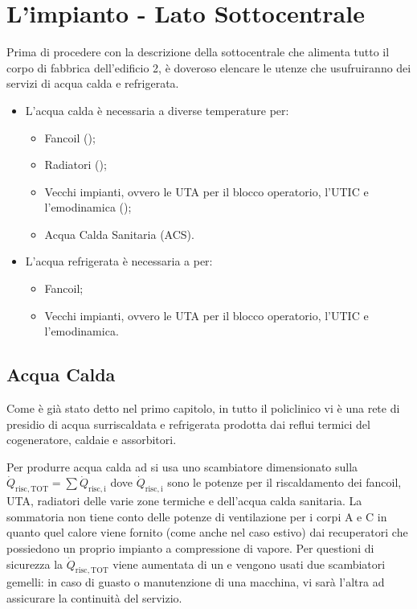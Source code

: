 \section{L'impianto - Lato Sottocentrale}
Prima di procedere con la descrizione della sottocentrale che alimenta tutto il corpo di fabbrica dell'edificio 2, è doveroso elencare le utenze che usufruiranno dei servizi di acqua calda e refrigerata.
\begin{itemize}
	\item L'acqua calda è necessaria a diverse temperature per:
	\begin{itemize}
		\item Fancoil ();
		\item Radiatori ();
		\item Vecchi impianti, ovvero le UTA per il blocco operatorio, l'UTIC e l'emodinamica ();
		\item Acqua Calda Sanitaria (ACS).
	\end{itemize}
	\item L'acqua refrigerata è necessaria a  per:
	\begin{itemize}
		\item Fancoil;
		\item Vecchi impianti, ovvero le UTA per il blocco operatorio, l'UTIC e l'emodinamica.
	\end{itemize}
\end{itemize}
\subsection{Acqua Calda}
Come è già stato detto nel primo capitolo, in tutto il policlinico vi è una rete di presidio di acqua surriscaldata e refrigerata prodotta dai reflui termici del cogeneratore, caldaie e assorbitori. 

Per produrre acqua calda ad  si usa uno scambiatore dimensionato sulla $\dot{Q}_{\mathrm{risc,TOT}} = \sum \dot{Q}_{\mathrm{risc,i}}$ dove $\dot{Q}_{\mathrm{risc,i}}$ sono le potenze per il riscaldamento dei fancoil, UTA, radiatori delle varie zone termiche e dell'acqua calda sanitaria. La sommatoria non tiene conto delle potenze di ventilazione per i corpi A e C in quanto quel calore viene fornito (come anche nel caso estivo) dai recuperatori che possiedono un proprio impianto a compressione di vapore. Per questioni di sicurezza la $\dot{Q}_{\mathrm{risc,TOT}}$ viene aumentata di un  e vengono usati due scambiatori gemelli: in caso di guasto o manutenzione di una macchina, vi sarà l'altra ad assicurare la continuità del servizio.

